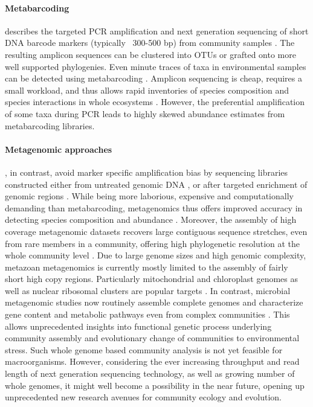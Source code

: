 \documentclass[12pt]{article}
\begin{document}
\paragraph{Metabarcoding} describes the targeted PCR amplification and
next generation sequencing of short DNA barcode markers (typically
~300-500 bp) from community samples \citep{Yu2012, ji2013}. The
resulting amplicon sequences can be clustered into OTUs or grafted
onto more well supported phylogenies. Even minute traces of taxa in
environmental samples can be detected using metabarcoding
\citep{bohmann2014}.  Amplicon sequencing is cheap, requires a small
workload, and thus allows rapid inventories of species composition and
species interactions in whole ecosystems \citep{gibson2014, leray2015,
  pompanon2012}. However, the preferential amplification of some taxa
during PCR leads to highly skewed abundance estimates
\citep{Yu2012, elbrecht2015} from metabarcoding libraries.

\paragraph{Metagenomic approaches}, in contrast, avoid marker specific
amplification bias by sequencing libraries constructed either from
untreated genomic DNA \citep{dodsworth2015, linard2015, tang2014}, or
after targeted enrichment of genomic regions \citep{liu2016}. While
being more laborious, expensive and computationally demanding than
metabarcoding, metagenomics thus offers improved accuracy in detecting
species composition and abundance \citep{zhou2013}. Moreover, the
assembly of high coverage metagenomic datasets recovers large
contiguous sequence stretches, even from rare members in a community,
offering high phylogenetic resolution at the whole community level
\citep{coissac2016}. Due to large genome sizes and high genomic
complexity, metazoan metagenomics is currently mostly limited to the
assembly of fairly short high copy regions. Particularly mitochondrial
and chloroplast genomes as well as nuclear ribosomal clusters are
popular targets \citep{dodsworth2015, coissac2016}. In contrast,
microbial metagenomic studies now routinely assemble complete genomes
and characterize gene content and metabolic pathways even from complex
communities \citep{nielsen2014}. This allows unprecedented insights
into functional genetic process underlying community assembly and
evolutionary change of communities to environmental stress.  Such
whole genome based community analysis is not yet feasible for
macroorganisms. However, considering the ever increasing throughput
and read length of next generation sequencing technology, as well as
growing number of whole genomes, it might well become a possibility in
the near future, opening up unprecedented new research avenues for
community ecology and evolution.
\end{document}

